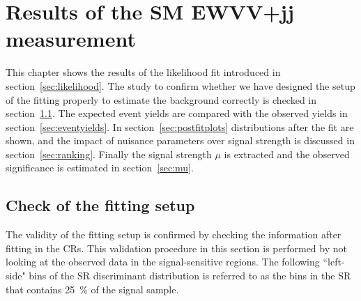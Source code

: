 \chapter{Results of the SM EWVV+jj measurement}
\label{chap:results}
This chapter shows the results of the likelihood fit introduced in section~\ref{sec:likelihood}.
The study to confirm whether we have designed the setup of the fitting properly to estimate the background correctly is checked in section~\ref{sec:confirm}.
The expected event yields are compared with the observed yields in section~\ref{sec:eventyields}.
In section~\ref{sec:postfitplots} distributions after the fit are shown, and the impact of nuisance parameters over signal strength is discussed in section~\ref{sec:ranking}.
Finally the signal strength $\mu$ is extracted and the observed significance is estimated in section~\ref{sec:mu}.

\section{Check of the fitting setup}
\label{sec:confirm}
The validity of the fitting setup is confirmed by checking the information after fitting in the CRs.
This validation procedure in this section is performed by not looking at the observed data in the signal-sensitive regions.
The following ``left-side" bins of the SR discriminant distribution is referred to as the bins in the SR that contains 25~\% of the signal sample.

